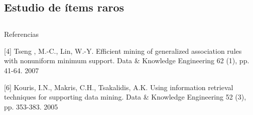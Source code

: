\ABIERTO




\subsection{Estudio de ítems raros}
\label{sec:arm:items-raros}



\subsection{\ROPs}
\label{sec:arm:ROP}



{\color{red}
Referencias

[4] Tseng , M.-C., Lin, W.-Y. Efficient mining of
generalized association rules with nonuniform
minimum support. Data \& Knowledge
Engineering 62 (1), pp. 41-64. 2007


[6] Kouris, I.N., Makris, C.H., Tsakalidis, A.K.
Using information retrieval techniques for
supporting data mining. Data \& Knowledge
Engineering 52 (3), pp. 353-383. 2005

}







